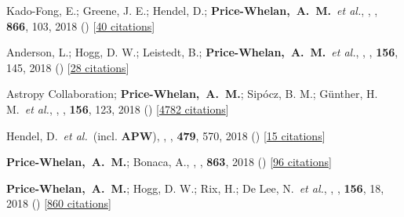 \item[{\color{deemph}\scriptsize45}]Kado-Fong, E.; Greene, J. E.; Hendel, D.; \textbf{Price-Whelan,~A.~M.}~\textit{et al.}, , \apj, \textbf{866}, 103, 2018 () [\href{http://adsabs.harvard.edu/abs/2018ApJ...866..103K}{40 citations}]

\item[{\color{deemph}\scriptsize44}]Anderson, L.; Hogg, D. W.; Leistedt, B.; \textbf{Price-Whelan,~A.~M.}~\textit{et al.}, , \aj, \textbf{156}, 145, 2018 () [\href{http://adsabs.harvard.edu/abs/2018AJ....156..145A}{28 citations}]

\item[{\color{deemph}\scriptsize43}]Astropy Collaboration; \textbf{Price-Whelan,~A.~M.}; Sip{\'{o}}cz, B. M.; G{\"u}nther, H. M.~\textit{et al.}, , \aj, \textbf{156}, 123, 2018 () [\href{http://adsabs.harvard.edu/abs/2018AJ....156..123A}{4782 citations}]

\item[{\color{deemph}\scriptsize42}]Hendel, D.~\textit{et al.}~(incl. \textbf{APW}), , \mnras, \textbf{479}, 570, 2018 () [\href{http://adsabs.harvard.edu/abs/2018MNRAS.479..570H}{15 citations}]

\item[{\color{deemph}\scriptsize41}]\textbf{Price-Whelan,~A.~M.}; Bonaca, A., , \apj, \textbf{863}, 2018 () [\href{http://adsabs.harvard.edu/abs/2018ApJ...863L..20P}{96 citations}]

\item[{\color{deemph}\scriptsize40}]\textbf{Price-Whelan,~A.~M.}; Hogg, D. W.; Rix, H.; De Lee, N.~\textit{et al.}, , \aj, \textbf{156}, 18, 2018 () [\href{http://adsabs.harvard.edu/abs/2018AJ....156...18P}{860 citations}]

